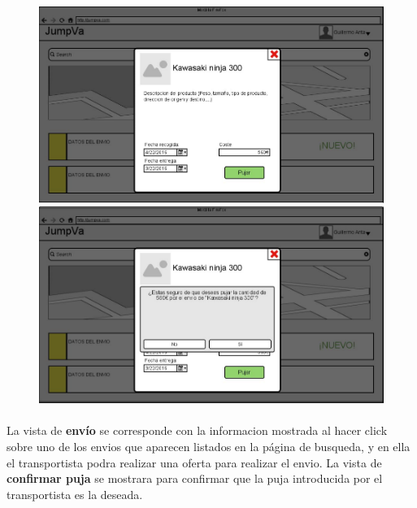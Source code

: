 \documentclass[10pt, a4paper,spanish]{article}
\begin{document}
		\begin{figure}[H]
			\centering
			\begin{minipage}[b]{0.49\textwidth}
				\includegraphics[width=\textwidth]{res/DetallesDeEnvio.png}
			\end{minipage}
			\begin{minipage}[b]{0.49\textwidth}
				\includegraphics[width=\textwidth]{res/ConfirmacionDePuja.png}
			\end{minipage}
		\end{figure}

		\paragraph{}
		La vista de \textbf{envío} se corresponde con la informacion mostrada al hacer click sobre uno de los envios que aparecen listados en la página de busqueda, y en ella el transportista podra realizar una oferta para realizar el envio. La vista de \textbf{confirmar puja} se mostrara para confirmar que la puja introducida por el transportista es la deseada.
\end{document}
